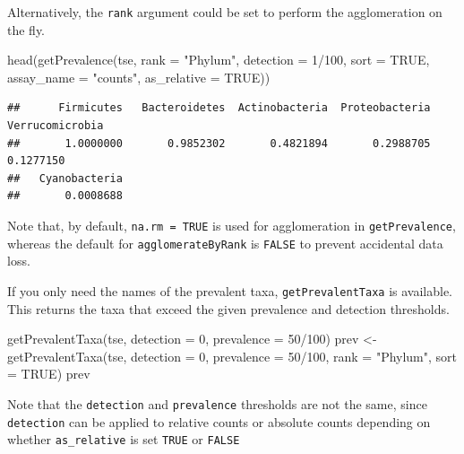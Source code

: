 \documentclass[
]{book}
\newenvironment{Shaded}{\begin{snugshade}}{\end{snugshade}}
\newcommand{\AttributeTok}[1]{\textcolor[rgb]{0.77,0.63,0.00}{#1}}
\newcommand{\ConstantTok}[1]{\textcolor[rgb]{0.00,0.00,0.00}{#1}}
\newcommand{\DecValTok}[1]{\textcolor[rgb]{0.00,0.00,0.81}{#1}}
\newcommand{\FunctionTok}[1]{\textcolor[rgb]{0.00,0.00,0.00}{#1}}
\newcommand{\NormalTok}[1]{#1}
\newcommand{\OtherTok}[1]{\textcolor[rgb]{0.56,0.35,0.01}{#1}}
\newcommand{\SpecialCharTok}[1]{\textcolor[rgb]{0.00,0.00,0.00}{#1}}
\newcommand{\StringTok}[1]{\textcolor[rgb]{0.31,0.60,0.02}{#1}}
\begin{document}
Alternatively, the \texttt{rank} argument could be set to perform the agglomeration on
the fly.

\begin{Shaded}
\begin{Highlighting}[]
\FunctionTok{head}\NormalTok{(}\FunctionTok{getPrevalence}\NormalTok{(tse, }\AttributeTok{rank =} \StringTok{"Phylum"}\NormalTok{, }\AttributeTok{detection =} \DecValTok{1}\SpecialCharTok{/}\DecValTok{100}\NormalTok{, }\AttributeTok{sort =} \ConstantTok{TRUE}\NormalTok{,}
                   \AttributeTok{assay\_name =} \StringTok{"counts"}\NormalTok{, }\AttributeTok{as\_relative =} \ConstantTok{TRUE}\NormalTok{))}
\end{Highlighting}
\end{Shaded}

\begin{verbatim}
##      Firmicutes   Bacteroidetes  Actinobacteria  Proteobacteria Verrucomicrobia 
##       1.0000000       0.9852302       0.4821894       0.2988705       0.1277150 
##   Cyanobacteria 
##       0.0008688
\end{verbatim}

Note that, by default, \texttt{na.rm\ =\ TRUE} is used for agglomeration in
\texttt{getPrevalence}, whereas the default for \texttt{agglomerateByRank} is
\texttt{FALSE} to prevent accidental data loss.

If you only need the names of the prevalent taxa, \texttt{getPrevalentTaxa}
is available. This returns the taxa that exceed the given prevalence
and detection thresholds.

\begin{Shaded}
\begin{Highlighting}[]
\FunctionTok{getPrevalentTaxa}\NormalTok{(tse, }\AttributeTok{detection =} \DecValTok{0}\NormalTok{, }\AttributeTok{prevalence =} \DecValTok{50}\SpecialCharTok{/}\DecValTok{100}\NormalTok{)}
\NormalTok{prev }\OtherTok{\textless{}{-}} \FunctionTok{getPrevalentTaxa}\NormalTok{(tse, }\AttributeTok{detection =} \DecValTok{0}\NormalTok{, }\AttributeTok{prevalence =} \DecValTok{50}\SpecialCharTok{/}\DecValTok{100}\NormalTok{,}
                         \AttributeTok{rank =} \StringTok{"Phylum"}\NormalTok{, }\AttributeTok{sort =} \ConstantTok{TRUE}\NormalTok{)}
\NormalTok{prev}
\end{Highlighting}
\end{Shaded}

Note that the \texttt{detection} and \texttt{prevalence} thresholds are not the same, since
\texttt{detection} can be applied to relative counts or absolute counts depending on
whether \texttt{as\_relative} is set \texttt{TRUE} or \texttt{FALSE}
\end{document}
